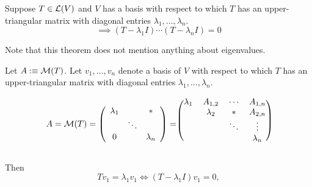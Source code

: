 \begin{thm}
  \label{thm: equation satisfied by operator with upper triangular matrix}
  Suppose $T\in \mathcal{L}(V)$ and $V$ has a basis with respect to which $T$ has an upper-triangular matrix with diagonal entries $\lambda_1, \dots, \lambda_n$.
  \begin{equation}
    \implies (T-\lambda_1I) \cdots (T-\lambda_nI)=0
  \end{equation}

  Note that this theorem does not mention anything about eigenvalues.
\end{thm}
\begin{prf}
  Let $A :\equiv \mathcal{M}(T)$. Let $v_1, \ldots, v_n$ denote a basis of $V$ with respect to which $T$  has an upper-triangular matrix with diagonal entries $\lambda_1, \ldots, \lambda_n$.

  \begin{minipage}{\linewidth}
  \begin{equation}
    A = \mmatrix(T)
    =
    \left( {\begin{array}{ccc}
        \lambda_1 &         &  * \\
                  &  \ddots &    \\
        0         &         & \lambda_n
    \end{array} } \right)
    =
    \begin{blockarray}{(cccc)}
       \lambda_1&  A_{1,2}  &  \cdots &  A_{1,n} \\
                & \lambda_2 &     *   &  A_{2,n} \\
                &           &  \ddots &  \vdots  \\
                &           &         & \lambda_n
    \end{blockarray}
  \end{equation}
  \end{minipage}

  Then
  \begin{equation}
    \label{i-need-a-ref}
    T v_1 = \lambda_1 v_1 \iff (T-\lambda_1 I)  v_1 = 0,
  \end{equation}


\end{prf}

